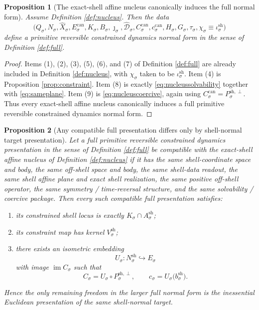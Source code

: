 \documentclass[11pt]{article}
\newcommand{\CoordSpace}[1]{Q_{#1}}
\newcommand{\CoordBody}[1]{K_{#1}}
\newcommand{\NormalSpace}[1]{N_{#1}}
\newcommand{\NormalBody}[1]{B_{#1}}
\newcommand{\VisibleAffine}[1]{\widehat X_{#1}}
\newcommand{\AffineData}[1]{\widehat{\mathcal D}_{#1}}
\newcommand{\ConstraintTarget}[1]{E_{#1}}
\newcommand{\ConstraintMap}[1]{C_{#1}}
\newcommand{\ConstraintValue}[1]{c_{#1}}
\newcommand{\NormalOperator}[1]{H_{#1}}
\newcommand{\SymGroup}[1]{G_{#1}}
\newcommand{\TimeRev}[1]{\tau_{#1}}
\newcommand{\ShellChart}[1]{\chi_{#1}}
\newcommand{\ShellAffine}[1]{A_{#1}^{\mathrm{sh}}}
\newcommand{\ShellDir}[1]{V_{#1}^{\mathrm{sh}}}
\newcommand{\ShellNormal}[1]{N_{#1}^{\mathrm{sh}}}
\newcommand{\ShellProj}[1]{P_{#1}^{\mathrm{sh},\perp}}
\newcommand{\ShellOffset}[1]{b_{#1}^{\mathrm{sh}}}
\newcommand{\ShellEmbed}[1]{\iota_{#1}^{\mathrm{sh}}}
\newtheorem{proposition}{Proposition}
\begin{document}
\begin{proposition}[The exact-shell affine nucleus canonically induces the full normal form]
\label{prop:recover}
Assume Definition \ref{def:nucleus}. Then the data
\[
\bigl(
\CoordSpace{\sigma},
\NormalSpace{\sigma},
\VisibleAffine{\sigma},
\ConstraintTarget{\sigma}^{\mathrm{can}},
\CoordBody{\sigma},
\NormalBody{\sigma},
\jmath_{\sigma},
\AffineData{\sigma},
\ConstraintMap{\sigma}^{\mathrm{can}},
\ConstraintValue{\sigma}^{\mathrm{can}},
\NormalOperator{\sigma},
\SymGroup{\sigma},
\TimeRev{\sigma},
\ShellChart{\sigma}\equiv\ShellEmbed{\sigma}
\bigr)
\]
define a primitive reversible constrained dynamics normal form in the sense of Definition \ref{def:full}.
\end{proposition}

\begin{proof}
Items (1), (2), (3), (5), (6), and (7) of Definition \ref{def:full} are already included in Definition \ref{def:nucleus}, with \(\ShellChart{\sigma}\) taken to be \(\ShellEmbed{\sigma}\). Item (4) is Proposition \ref{prop:constraint}. Item (8) is exactly \eqref{eq:nucleussolvability} together with \eqref{eq:sameplane}. Item (9) is \eqref{eq:nucleuscoercive}, again using \(\ConstraintMap{\sigma}^{\mathrm{can}}=\ShellProj{\sigma}\). Thus every exact-shell affine nucleus canonically induces a full primitive reversible constrained dynamics normal form.
\end{proof}

\begin{proposition}[Any compatible full presentation differs only by shell-normal target presentation]
\label{prop:uniqueness}
Let a full primitive reversible constrained dynamics presentation in the sense of Definition \ref{def:full} be \emph{compatible} with the exact-shell affine nucleus of Definition \ref{def:nucleus} if it has the same shell-coordinate space and body, the same off-shell space and body, the same shell-data readout, the same shell affine plane and exact shell realization, the same positive off-shell operator, the same symmetry / time-reversal structure, and the same solvability / coercive package. Then every such compatible full presentation satisfies:
\begin{enumerate}
    \item its constrained shell locus is exactly \(\CoordBody{\sigma}\cap\ShellAffine{\sigma}\);
    \item its constraint map has kernel \(\ShellDir{\sigma}\);
    \item there exists an isometric embedding
    \[
    U_{\sigma}:\ShellNormal{\sigma}\hookrightarrow \ConstraintTarget{\sigma}
    \]
    with image \(\operatorname{im}\ConstraintMap{\sigma}\) such that
    \begin{equation}
    \ConstraintMap{\sigma}
    =
    U_{\sigma}\circ \ShellProj{\sigma},
    \qquad
    \ConstraintValue{\sigma}
    =
    U_{\sigma}\bigl(\ShellOffset{\sigma}\bigr).
    \label{eq:targetpresentation}
    \end{equation}
\end{enumerate}
Hence the only remaining freedom in the larger full normal form is the inessential Euclidean presentation of the same shell-normal target.
\end{proposition}
\end{document}
